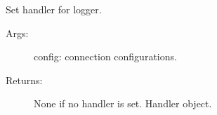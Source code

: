 \documentclass[letterpaper,10pt,english]{sphinxmanual}
\begin{document}
\begin{fulllineitems}
\begin{fulllineitems}
\label{\detokenize{QConnectionLibrary:QConnectionLibrary.qlogger.QLogger.set_handler}}
\sphinxAtStartPar
Set handler for logger.
\begin{description}
\item[{Args:}] \leavevmode
\sphinxAtStartPar
config: connection configurations.

\item[{Returns:}] \leavevmode
\sphinxAtStartPar
None if no handler is set.
Handler object.

\end{description}

\end{fulllineitems}


\end{fulllineitems}

\label{\detokenize{QConnectionLibrary:module-QConnectionLibrary.tcp.tcp_base}}
\end{document}
